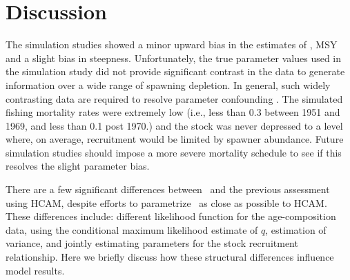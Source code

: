 
\section{Discussion}



The simulation studies showed a minor upward bias in the estimates of \fmsy, MSY and a slight bias in steepness.  Unfortunately, the true parameter values used in the simulation study did not provide significant contrast in the data to generate information over a wide range of spawning depletion.  In general, such widely contrasting data are required to resolve parameter confounding \citep{hilborn1992quantitative}.  The simulated fishing mortality rates were extremely low (i.e., less than 0.3 between 1951 and 1969, and less than 0.1 post 1970.) and the stock was never depressed to a level where, on average, recruitment would be limited by spawner abundance.  Future simulation studies should impose a more severe mortality schedule to see if this resolves the slight parameter bias.

There are a few  significant differences between  \iscam\  and the previous assessment using HCAM, despite efforts to parametrize \iscam\ as close as possible to HCAM. These differences include: different likelihood function for the age-composition data, using the conditional maximum likelihood estimate of $q$, estimation of variance, and jointly estimating parameters for the stock recruitment relationship.  Here we briefly discuss how these structural differences influence model results.

